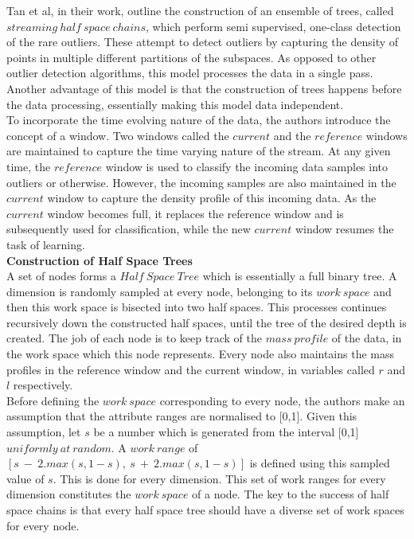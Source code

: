 Tan et al, in their work\cite{tan2011fast}, outline the construction of an ensemble of trees, called $streaming\ half\ space\ chains$, which perform semi supervised, one-class detection of the rare outliers. These attempt to detect outliers by capturing the density of points in multiple different partitions of the subspaces. As opposed to other outlier detection algorithms, this model processes the data in a single pass. Another advantage of this model is that the construction of trees happens before the data processing, essentially making this model data independent. \\

To incorporate the time evolving nature of the data, the authors introduce the concept of a window. Two windows called the $current$ and the $reference$ windows are maintained to capture the time varying nature of the stream. At any given time, the $reference$ window is used to classify the incoming data samples into outliers or otherwise. However, the incoming samples are also maintained in the $current$ window to capture the density profile of this incoming data. As the $current$ window becomes full, it replaces the reference window and is subsequently used for classification, while the new $current$ window resumes the task of learning. \\

\noindent \textbf{Construction of Half Space Trees} \\

A set of nodes forms a $Half\ Space\ Tree$ which is essentially a full binary tree. A dimension is randomly sampled at every node, belonging to its $work\ space$ and then this work space is bisected into two half spaces. This processes continues recursively down the constructed half spaces, until the tree of the desired depth is created. The job of each node is to keep track of the $mass\ profile$ of the data, in the work space which this node represents. Every node also maintains the mass profiles in the reference window and the current window, in variables called $r$ and $l$ respectively. \\

Before defining the $work\ space$ corresponding to every node, the authors make an assumption that the attribute ranges are normalised to [0,1]. Given this assumption, let $s$ be a number which is generated from the interval [0,1] $uniformly\ at\ random$. A $work\ range$ of $[s\ -\ 2.max(s,1-s),\ s\ +\ 2.max(s,1-s)]$ is defined using this sampled value of $s$. This is done for every dimension. This set of work ranges for every dimension constitutes the $work\ space$ of a node. The key to the success of half space chains is that every half space tree should have a diverse set of work spaces for every node. \\


